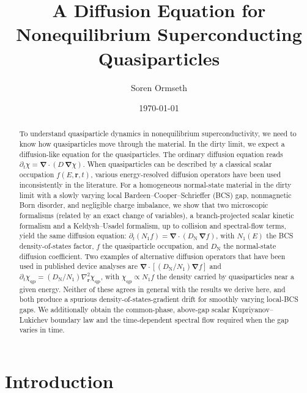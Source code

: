 \documentclass[
  aps,
  prb,
  preprint,
  superscriptaddress,
  longbibliography,
  nofootinbib
]{revtex4-2}
\newcommand{\br}{\mathbf{r}}
\newcommand{\bnabla}{\boldsymbol{\nabla}}
\newcommand{\DOS}{N_1}
\newcommand{\DN}{D_{\mathrm{N}}}
\newcommand{\qp}{\mathrm{qp}}
\begin{document}
\title{A Diffusion Equation for Nonequilibrium Superconducting Quasiparticles}

\author{Soren Ormseth}

\date{\today}

\begin{abstract}
To understand quasiparticle dynamics in nonequilibrium superconductivity, we need to know how quasiparticles move through the material. 
In the dirty limit, we expect a diffusion-like equation for the quasiparticles.  
The ordinary diffusion equation reads \( \partial_t \chi = \bnabla\cdot(D\,\bnabla \chi) \). 
When quasiparticles can be described by a classical scalar occupation \(f(E,\br,t)\), various energy-resolved diffusion operators have been used inconsistently in the literature. 
For a homogeneous normal-state material in the dirty limit with a
slowly varying local Bardeen–Cooper–Schrieffer (BCS) gap, nonmagnetic Born disorder, and negligible
charge imbalance, we show that two microscopic formalisms (related by an exact change of variables), a
branch-projected scalar kinetic formalism and a Keldysh--Usadel
formalism, up to collision and spectral-flow terms, yield the same diffusion equation:
\(\partial_t(\DOS f)=\bnabla\cdot(\DN\,\bnabla f)\), with \(\DOS(E)\)
the BCS density-of-states factor, \(f\) the quasiparticle occupation,
and \(\DN\) the normal-state diffusion coefficient. Two examples of alternative diffusion operators that have been used in
published device analyses are \(\bnabla\cdot[(\DN/\DOS)\bnabla f]\) and \(\partial_t\chi_{\qp}=(\DN/\DOS)\nabla_{\br}^{2}\chi_{\qp}\), with
\(\chi_{\qp} \propto\DOS f\) the density carried by quasiparticles near a given
energy. Neither of these agrees in general with the results we derive here, and
both produce a spurious density-of-states-gradient drift for smoothly varying local-BCS gaps.
We additionally obtain the common-phase, above-gap scalar Kupriyanov--Lukichev
boundary law and the time-dependent spectral flow required when the gap varies in time.
\end{abstract}

\maketitle


\section{Introduction}
\end{document}
